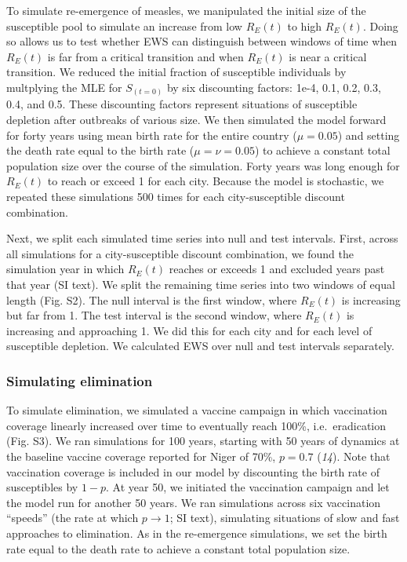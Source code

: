 \documentclass[3p]{elsarticle} %
\begin{document}
To simulate re-emergence of measles, we manipulated the initial size of
the susceptible pool to simulate an increase from low \(R_E(t)\) to high
\(R_E(t)\). Doing so allows us to test whether EWS can distinguish
between windows of time when \(R_E(t)\) is far from a critical
transition and when \(R_E(t)\) is near a critical transition. We reduced
the initial fraction of susceptible individuals by multplying the MLE
for \(S_{(t=0)}\) by six discounting factors: 1e-4, 0.1, 0.2, 0.3, 0.4,
and 0.5. These discounting factors represent situations of susceptible
depletion after outbreaks of various size. We then simulated the model
forward for forty years using mean birth rate for the entire country
(\(\mu = 0.05\)) and setting the death rate equal to the birth rate
(\(\mu = \nu = 0.05\)) to achieve a constant total population size over
the course of the simulation. Forty years was long enough for \(R_E(t)\)
to reach or exceed 1 for each city. Because the model is stochastic, we
repeated these simulations 500 times for each city-susceptible discount
combination.

Next, we split each simulated time series into null and test intervals.
First, across all simulations for a city-susceptible discount
combination, we found the simulation year in which \(R_E(t)\) reaches or
exceeds 1 and excluded years past that year (SI text). We split the
remaining time series into two windows of equal length (Fig. S2). The
null interval is the first window, where \(R_E(t)\) is increasing but
far from 1. The test interval is the second window, where \(R_E(t)\) is
increasing and approaching 1. We did this for each city and for each
level of susceptible depletion. We calculated EWS over null and test
intervals separately.

\hypertarget{simulating-elimination}{%
\subsubsection{Simulating elimination}\label{simulating-elimination}}

To simulate elimination, we simulated a vaccine campaign in which
vaccination coverage linearly increased over time to eventually reach
100\%, i.e.~eradication (Fig. S3). We ran simulations for 100 years,
starting with 50 years of dynamics at the baseline vaccine coverage
reported for Niger of 70\%, \(p = 0.7\) (\emph{14}). Note that
vaccination coverage is included in our model by discounting the birth
rate of susceptibles by \(1-p\). At year 50, we initiated the
vaccination campaign and let the model run for another 50 years. We ran
simulations across six vaccination ``speeds'' (the rate at which
\(p \rightarrow 1\); SI text), simulating situations of slow and fast
approaches to elimination. As in the re-emergence simulations, we set
the birth rate equal to the death rate to achieve a constant total
population size.
\end{document}
